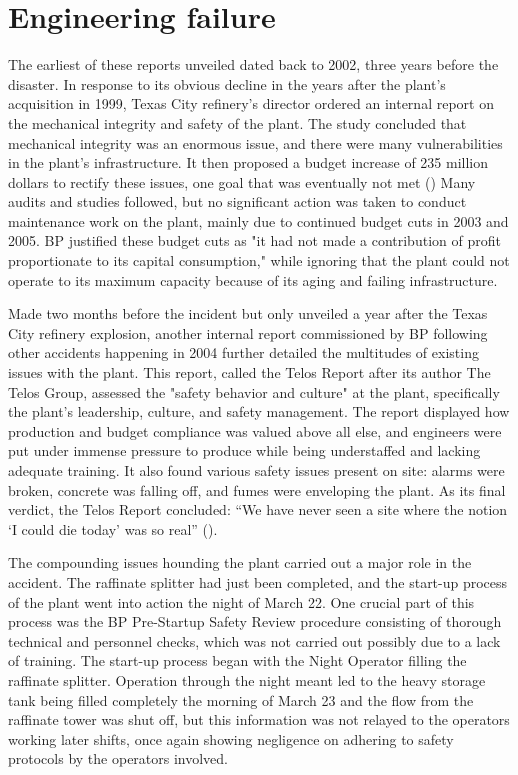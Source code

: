 \documentclass[12pt]{article}
\begin{document}
	\section*{Engineering failure}
	The earliest of these reports unveiled dated back to 2002, three years before the disaster. In response to its obvious decline in the years after the plant's acquisition in 1999, Texas City refinery's director ordered an internal report on the mechanical integrity and safety of the plant. The study concluded that mechanical integrity was an enormous issue, and there were many vulnerabilities in the plant's infrastructure. It then proposed a budget increase of 235 million dollars to rectify these issues, one goal that was eventually not met (\cite{csbreport}) Many audits and studies followed, but no significant action was taken to conduct maintenance work on the plant, mainly due to continued budget cuts in 2003 and 2005. BP justified these budget cuts as "it had not made a contribution of profit proportionate to its capital consumption," while ignoring that the plant could not operate to its maximum capacity because of its aging and failing infrastructure.
	
	Made two months before the incident but only unveiled a year after the Texas City refinery explosion, another internal report commissioned by BP following other accidents happening in 2004 further detailed the multitudes of existing issues with the plant. This report, called the Telos Report after its author The Telos Group, assessed the "safety behavior and culture" at the plant, specifically the plant's leadership, culture, and safety management. The report displayed how production and budget compliance was valued above all else, and engineers were put under immense pressure to produce while being understaffed and lacking adequate training. It also found various safety issues present on site: alarms were broken, concrete was falling off, and fumes were enveloping the plant. As its final verdict, the Telos Report concluded: “We have never seen a site where the notion ‘I could die today’ was so real” (\cite{telosreport}).
	
	The compounding issues hounding the plant carried out a major role in the accident. The raffinate splitter had just been completed, and the start-up process of the plant went into action the night of March 22. One crucial part of this process was the BP Pre-Startup Safety Review procedure consisting of thorough technical and personnel checks, which was not carried out possibly due to a lack of training. The start-up process began with the Night Operator filling the raffinate splitter. Operation through the night meant led to the heavy storage tank being filled completely the morning of March 23 and the flow from the raffinate tower was shut off, but this information was not relayed to the operators working later shifts, once again showing negligence on adhering to safety protocols by the operators involved. 
	
\end{document}
